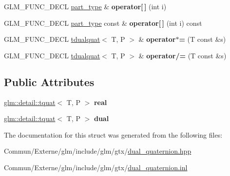 \begin{DoxyCompactItemize}
\item 
G\+L\+M\+\_\+\+F\+U\+N\+C\+\_\+\+D\+E\+CL \hyperlink{structglm_1_1detail_1_1tquat}{part\+\_\+type} \& {\bfseries operator\mbox{[}$\,$\mbox{]}} (int i)\hypertarget{structglm_1_1detail_1_1tdualquat_a6c97baca66efdfefa2e127d4868ce22c}{}\label{structglm_1_1detail_1_1tdualquat_a6c97baca66efdfefa2e127d4868ce22c}

\item 
G\+L\+M\+\_\+\+F\+U\+N\+C\+\_\+\+D\+E\+CL \hyperlink{structglm_1_1detail_1_1tquat}{part\+\_\+type} const \& {\bfseries operator\mbox{[}$\,$\mbox{]}} (int i) const \hypertarget{structglm_1_1detail_1_1tdualquat_a7a646a4f41587c5a8ba9ebb728b64b24}{}\label{structglm_1_1detail_1_1tdualquat_a7a646a4f41587c5a8ba9ebb728b64b24}

\item 
G\+L\+M\+\_\+\+F\+U\+N\+C\+\_\+\+D\+E\+CL \hyperlink{structglm_1_1detail_1_1tdualquat}{tdualquat}$<$ T, P $>$ \& {\bfseries operator$\ast$=} (T const \&s)\hypertarget{structglm_1_1detail_1_1tdualquat_ab958553d52f05997218dc32ff66308ff}{}\label{structglm_1_1detail_1_1tdualquat_ab958553d52f05997218dc32ff66308ff}

\item 
G\+L\+M\+\_\+\+F\+U\+N\+C\+\_\+\+D\+E\+CL \hyperlink{structglm_1_1detail_1_1tdualquat}{tdualquat}$<$ T, P $>$ \& {\bfseries operator/=} (T const \&s)\hypertarget{structglm_1_1detail_1_1tdualquat_a16b0b3f78c28d7cf982761d66dada98d}{}\label{structglm_1_1detail_1_1tdualquat_a16b0b3f78c28d7cf982761d66dada98d}

\end{DoxyCompactItemize}
\subsection*{Public Attributes}
\begin{DoxyCompactItemize}
\item 
\hyperlink{structglm_1_1detail_1_1tquat}{glm\+::detail\+::tquat}$<$ T, P $>$ {\bfseries real}\hypertarget{structglm_1_1detail_1_1tdualquat_abebb177d1dca2b170fe7d01e9970eb37}{}\label{structglm_1_1detail_1_1tdualquat_abebb177d1dca2b170fe7d01e9970eb37}

\item 
\hyperlink{structglm_1_1detail_1_1tquat}{glm\+::detail\+::tquat}$<$ T, P $>$ {\bfseries dual}\hypertarget{structglm_1_1detail_1_1tdualquat_a6d739e4771a6244cc15562c2ecda7fdc}{}\label{structglm_1_1detail_1_1tdualquat_a6d739e4771a6244cc15562c2ecda7fdc}

\end{DoxyCompactItemize}


The documentation for this struct was generated from the following files\+:\begin{DoxyCompactItemize}
\item 
Commun/\+Externe/glm/include/glm/gtx/\hyperlink{dual__quaternion_8hpp}{dual\+\_\+quaternion.\+hpp}\item 
Commun/\+Externe/glm/include/glm/gtx/\hyperlink{dual__quaternion_8inl}{dual\+\_\+quaternion.\+inl}\end{DoxyCompactItemize}
